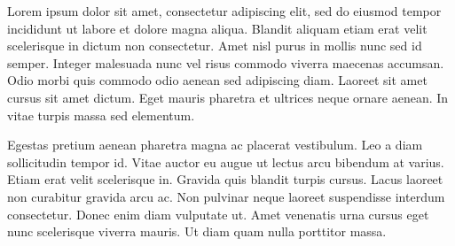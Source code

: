 \documentclass{article}
\begin{document}
Lorem ipsum dolor sit amet, consectetur adipiscing elit, sed do eiusmod tempor incididunt ut labore et dolore magna aliqua. Blandit aliquam etiam erat velit scelerisque in dictum non consectetur. Amet nisl purus in mollis nunc sed id semper. Integer malesuada nunc vel risus commodo viverra maecenas accumsan. Odio morbi quis commodo odio aenean sed adipiscing diam. Laoreet sit amet cursus sit amet dictum. Eget mauris pharetra et ultrices neque ornare aenean. In vitae turpis massa sed elementum.

Egestas pretium aenean pharetra magna ac placerat vestibulum. Leo a diam sollicitudin tempor id. Vitae auctor eu augue ut lectus arcu bibendum at varius. Etiam erat velit scelerisque in. Gravida quis blandit turpis cursus. Lacus laoreet non curabitur gravida arcu ac. Non pulvinar neque laoreet suspendisse interdum consectetur. Donec enim diam vulputate ut. Amet venenatis urna cursus eget nunc scelerisque viverra mauris. Ut diam quam nulla porttitor massa.
\end{document}
